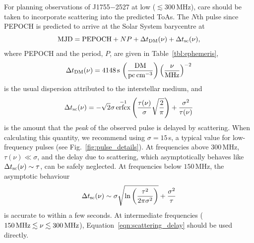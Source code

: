 \documentclass[fleqn,usenatbib]{mnras}
\newcommand{\src}{J1755$-$2527}
\DeclareMathOperator{\erfcx}{erfcx}
\newcommand{\Fig}{Fig.}
\newcommand{\Tab}{Table}
\newcommand{\Eqn}{Equation}
\begin{document}
For planning observations of \src{} at low ($\lesssim 300$\,MHz), care should be taken to incorporate scattering into the predicted ToAs.
The $N$th pulse since PEPOCH is predicted to arrive at the Solar System barycentre at
\begin{equation}
    {\rm MJD} = {\rm PEPOCH} + NP + \Delta t_{\rm DM}(\nu) + \Delta t_{\rm sc}(\nu),
    \label{eqn:timing}
\end{equation}
where PEPOCH and the period, $P$, are given in \Tab~\ref{tbl:ephemeris},
\begin{equation}
    \Delta t_{\rm DM}(\nu) = 4148\,{\rm s} \, \left(\frac{\rm DM}{{\rm pc\,cm}^{-3}}\right) \left(\frac{\nu}{\rm MHz}\right)^{-2}
\end{equation}
is the usual dispersion attributed to the interstellar medium, and
\begin{equation}
    \Delta t_{\rm sc}(\nu) = -\sqrt{2}\sigma\erfcx^{-1}\left(\frac{\tau(\nu)}{\sigma}\sqrt{\frac{2}{\pi}}\right) + \frac{\sigma^2}{\tau(\nu)}
    \label{eqn:scattering_delay}
\end{equation}
is the amount that the \emph{peak} of the observed pulse is delayed by scattering.
When calculating this quantity, we recommend using $\sigma = 15\,$s, a typical value for low-frequency pulses (see \Fig~\ref{fig:pulse_details}).
At frequencies above $300\,$MHz, $\tau(\nu) \ll \sigma$, and the delay due to scattering, which asymptotically behaves like $\Delta t_{\rm sc}(\nu) \sim \tau$, can be safely neglected.
At frequencies below $150\,$MHz, the asymptotic behaviour
\begin{equation}
    \Delta t_{\rm sc}(\nu) \sim \sigma \sqrt{\ln \left(\frac{\tau^2}{2\pi \sigma^2}\right)} + \frac{\sigma^2}{\tau}
\end{equation}
is accurate to within a few seconds.
At intermediate frequencies ($150\,{\rm MHz} \lesssim \nu \lesssim 300\,{\rm MHz}$), \Eqn~\ref{eqn:scattering_delay} should be used directly.

\end{document}
